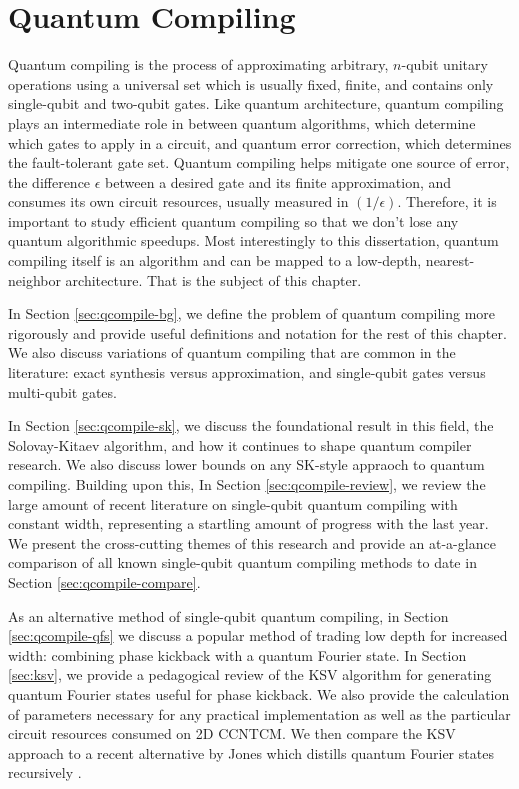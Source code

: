 \chapter{Quantum Compiling}
\label{chap:qcompile}

Quantum compiling is the process of approximating arbitrary,
$n$-qubit unitary operations using a universal set which
is usually fixed, finite, and contains only single-qubit
and two-qubit gates. Like quantum architecture, quantum
compiling plays an intermediate role in between quantum
algorithms, which determine which gates to apply in a circuit,
and quantum error correction, which determines the
fault-tolerant gate set.
Quantum compiling helps mitigate one source of error,
the difference $\epsilon$ between a desired gate and its
finite approximation,
and consumes its own circuit resources, usually measured in
$(1 / \epsilon)$.
Therefore, it is important to study efficient quantum 
compiling so that we don't lose any quantum algorithmic speedups.
Most interestingly to this dissertation, quantum compiling itself
is an algorithm and can be mapped to a low-depth, nearest-neighbor
architecture. That is the subject of this chapter.

In Section \ref{sec:qcompile-bg}, we define the problem of
quantum compiling more rigorously and provide useful definitions
and notation for the rest of this chapter. We also discuss
variations of quantum compiling that are common in the
literature: exact synthesis versus approximation, and
single-qubit gates versus multi-qubit gates.

In Section \ref{sec:qcompile-sk}, we discuss the foundational
result in this field, the Solovay-Kitaev algorithm, and how it
continues to shape quantum compiler research. We also discuss
lower bounds on any SK-style appraoch to quantum compiling.
Building upon this,
In Section \ref{sec:qcompile-review}, we review the large
amount of recent literature on single-qubit quantum compiling with
constant width, representing
a startling amount of progress with the last year. We present
the cross-cutting themes of this research and provide an
at-a-glance comparison of all known single-qubit quantum compiling methods
to date in Section \ref{sec:qcompile-compare}.

As an alternative method of single-qubit quantum compiling,
in Section \ref{sec:qcompile-qfs} we
discuss a popular method of trading low depth for increased
width: combining phase kickback with a quantum Fourier state.
In Section \ref{sec:ksv}, we provide a pedagogical review
of the KSV algorithm for generating quantum Fourier states
useful for phase kickback. We also provide the calculation of
parameters necessary for any practical implementation as well as
the particular circuit resources consumed on \textsf{2D CCNTCM}.
We then compare the KSV approach to a recent alternative
by Jones which distills quantum Fourier states recursively \cite{Jones2013}.

